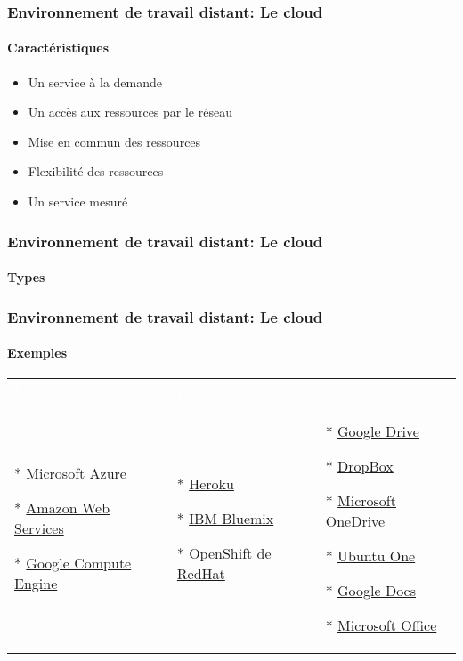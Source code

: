 \documentclass[xcolor=table]{beamer}
\begin{document}
\begin{frame}
\frametitle{Environnement de travail distant: Le cloud}
\framesubtitle{Caractéristiques}

\begin{itemize}
	\item Un service à la demande
	\item Un accès aux ressources par le réseau
	\item Mise en commun des ressources
	\item Flexibilité des ressources
	\item Un service mesuré
\end{itemize}


\end{frame}


\begin{frame}
\frametitle{Environnement de travail distant: Le cloud}
\framesubtitle{Types}


\end{frame}

\begin{frame}
\frametitle{Environnement de travail distant: Le cloud}
\framesubtitle{Exemples}

\begin{tabular}{p{}p{}p{}}
	\rowcolor{darkblue}
	\textcolor{white}{IaaS}  & \textcolor{white}{PaaS} & \textcolor{white}{SaaS} \\
	
	* \href{http://azure.microsoft.com/}{Microsoft Azure}
	
	* \href{https://aws.amazon.com}{Amazon Web Services}
	
	* \href{https://cloud.google.com/compute/}{Google Compute Engine}
	
	&
	
	* \href{https://www.heroku.com}{Heroku}
	
	* \href{https://www.ibm.com/cloud-computing/bluemix/}{IBM Bluemix}
	
	* \href{https://www.openshift.org/}{OpenShift de RedHat}
	
	&
	
	* \href{https://www.google.com/drive/}{Google Drive}
	
	* \href{https://www.dropbox.com/}{DropBox}
	
	* \href{https://onedrive.live.com/}{Microsoft OneDrive}
	
	* \href{http://one.ubuntu.com/}{Ubuntu One}
	 
	* \href{https://docs.google.com/}{Google Docs}
	
	* \href{https://microsoftonline.com}{Microsoft Office}
	\\
\end{tabular}


\end{frame}
\end{document}
